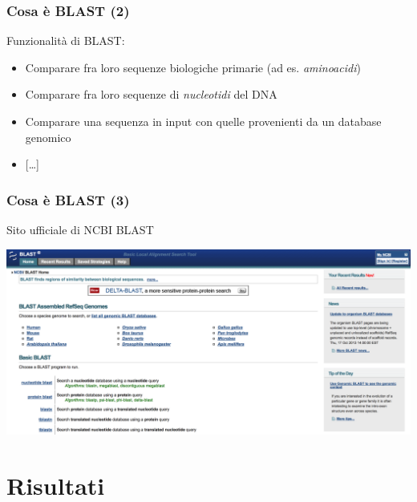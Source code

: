 \begin{frame}\frametitle{Cosa è BLAST (2)}

Funzionalità di BLAST:

\begin{itemize}[<+->]
\itemsep1pt\parskip0pt
\item
  Comparare fra loro sequenze biologiche primarie (ad es.
  \emph{aminoacidi})
\item
  Comparare fra loro sequenze di \emph{nucleotidi} del DNA
\item
  Comparare una sequenza in input con quelle provenienti da un database
  genomico
\item
  {[}\ldots{]}
\end{itemize}

\end{frame}

\begin{frame}\frametitle{Cosa è BLAST (3)}

\begin{center}
\Large{Sito ufficiale di NCBI BLAST}
\end{center}

\begin{center}
    \includegraphics[scale=.12]{img/ncbi_blast}
\end{center}

\end{frame}

\section{Risultati}


